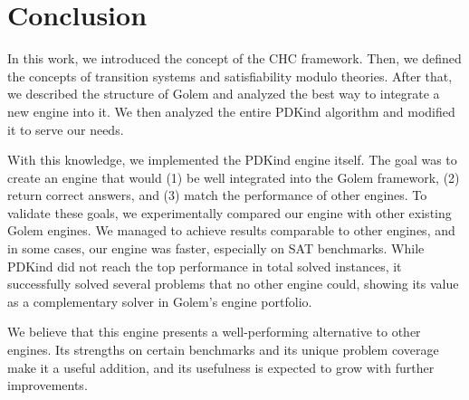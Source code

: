 \chapter{Conclusion}

In this work, we introduced the concept of the CHC framework. Then, we defined the concepts of transition systems and satisfiability modulo theories. After that, we described the structure of Golem and analyzed the best way to integrate a new engine into it. We then analyzed the entire PDKind algorithm and modified it to serve our needs.

With this knowledge, we implemented the PDKind engine itself. The goal was to create an engine that would (1) be well integrated into the Golem framework, (2) return correct answers, and (3) match the performance of other engines. To validate these goals, we experimentally compared our engine with other existing Golem engines. We managed to achieve results comparable to other engines, and in some cases, our engine was faster, especially on SAT benchmarks. While PDKind did not reach the top performance in total solved instances, it successfully solved several problems that no other engine could, showing its value as a complementary solver in Golem’s engine portfolio.

We believe that this engine presents a well-performing alternative to other engines. Its strengths on certain benchmarks and its unique problem coverage make it a useful addition, and its usefulness is expected to grow with further improvements.
